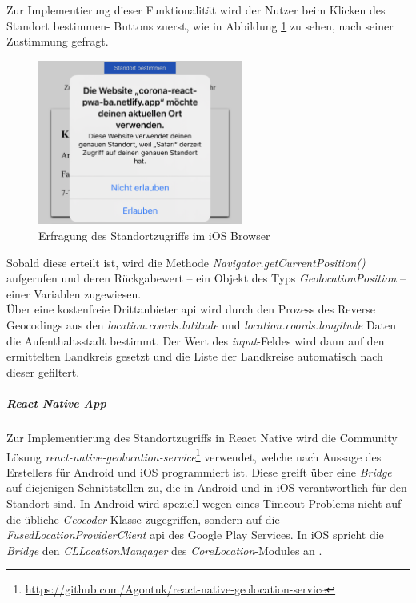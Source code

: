 Zur Implementierung dieser Funktionalität wird der Nutzer beim Klicken des \glqq Standort bestimmen\grqq{}- Buttons zuerst, wie in Abbildung \ref{fig:permission_safari} zu sehen, nach seiner Zustimmung gefragt.

\begin{figure}[h]
 \centering
 \includegraphics[width=0.6\textwidth]{figures/Permission_Safari.png}
 \caption{Erfragung des Standortzugriffs im iOS Browser}
 \label{fig:permission_safari}
\end{figure}

Sobald diese erteilt ist, wird die Methode \textit{Navigator.getCurrentPosition()} aufgerufen und deren Rückgabewert -- ein Objekt des Typs \textit{GeolocationPosition} -- einer Variablen zugewiesen.\\
Über eine kostenfreie Drittanbieter \ac{api} wird durch den Prozess des Reverse Geocodings aus den \textit{location.coords.latitude} und \textit{location.coords.longitude} Daten die Aufenthaltsstadt bestimmt.
Der Wert des \textit{input}-Feldes wird dann auf den ermittelten Landkreis gesetzt und die Liste der Landkreise automatisch nach dieser gefiltert.

\subparagraph{React Native App\\}
Zur Implementierung des Standortzugriffs in React Native wird die Community Lösung \textit{react-native-geolocation-service}\footnote{\url{https://github.com/Agontuk/react-native-geolocation-service}} verwendet, welche nach Aussage des Erstellers für Android und iOS programmiert ist.
Diese greift über eine \textit{Bridge} auf diejenigen Schnittstellen zu, die in Android und in iOS verantwortlich für den Standort sind.
In Android wird speziell wegen eines Timeout-Problems nicht auf die übliche \textit{Geocoder}-Klasse zugegriffen, sondern auf die \textit{FusedLocationProviderClient} \ac{api} des Google Play Services.
In iOS spricht die \textit{Bridge} den \textit{CLLocationMangager} des \textit{CoreLocation}-Modules an \cite{Agontuk.26.06.2021}.

